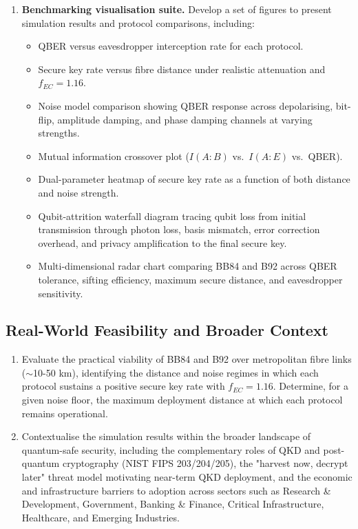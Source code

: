 \documentclass[10pt, a4paper]{report}
\begin{document}
\begin{enumerate}[label=\textbf{O5.\arabic*}, leftmargin=1.5cm]
    \item \textbf{Benchmarking visualisation suite.} Develop a set of figures to present simulation results and protocol comparisons, including:
    \begin{itemize}
        \item QBER versus eavesdropper interception rate for each protocol.
        \item Secure key rate versus fibre distance under realistic attenuation and $f_{EC} = 1.16$.
        \item Noise model comparison showing QBER response across depolarising, bit-flip, amplitude damping, and phase damping channels at varying strengths.
        \item Mutual information crossover plot ($I(A{:}B)$ vs.\ $I(A{:}E)$ vs.\ QBER).
        \item Dual-parameter heatmap of secure key rate as a function of both distance and noise strength.
        \item Qubit-attrition waterfall diagram tracing qubit loss from initial transmission through photon loss, basis mismatch, error correction overhead, and privacy amplification to the final secure key.
        \item Multi-dimensional radar chart comparing BB84 and B92 across QBER tolerance, sifting efficiency, maximum secure distance, and eavesdropper sensitivity.
    \end{itemize}
\end{enumerate}

\subsection{Real-World Feasibility and Broader Context}

\begin{enumerate}[label=\textbf{O6.\arabic*}, leftmargin=1.5cm]
    \item Evaluate the practical viability of BB84 and B92 over metropolitan fibre links ($\sim$10-50 km), identifying the distance and noise regimes in which each protocol sustains a positive secure key rate with $f_{EC} = 1.16$. Determine, for a given noise floor, the maximum deployment distance at which each protocol remains operational.

    \item Contextualise the simulation results within the broader landscape of quantum-safe security, including the complementary roles of QKD and post-quantum cryptography (NIST FIPS 203/204/205), the "harvest now, decrypt later" threat model motivating near-term QKD deployment, and the economic and infrastructure barriers to adoption across sectors such as Research \& Development, Government, Banking \& Finance, Critical Infrastructure, Healthcare, and Emerging Industries.
\end{enumerate}
\end{document}
